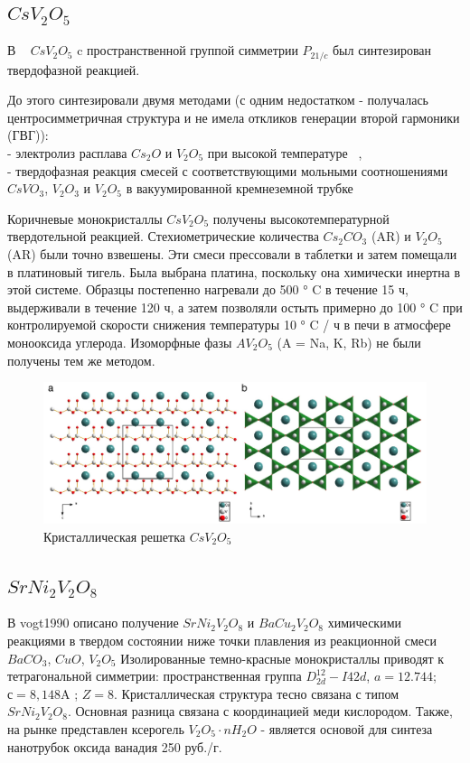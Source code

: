 \documentclass[11pt]{article}
\begin{document}
\subsection{$CsV_2O_5$}
В ~\cite{luo2013} $CsV_2O_5$ c пространственной группой симметрии $P_{21/c}$ был синтезирован твердофазной реакцией.

До этого синтезировали двумя методами (с одним недостатком - получалась центросимметричная структура и не имела откликов генерации второй гармоники (ГВГ)): \\

- электролиз расплава $Cs_2O$ и $V_2O_5$ при высокой температуре ~\cite{mumme_1971}, \\

- твердофазная реакция смесей с соответствующими мольными соотношениями $CsVO_3$, $V_2O_3$ и $V_2O_5$ в вакуумированной кремнеземной трубке ~\cite{Ueda_1998}

Коричневые монокристаллы $CsV_2O_5$ получены высокотемпературной твердотельной реакцией. Стехиометрические количества $Cs_2CO_3$ (AR) и $V_2O_5$ (AR) были точно взвешены. Эти смеси прессовали в таблетки и затем помещали в платиновый тигель. Была выбрана платина, поскольку она химически инертна в этой системе. Образцы постепенно нагревали до 500 ° C в течение 15 ч, выдерживали в течение 120 ч, а затем позволяли остыть примерно до 100 ° C при контролируемой скорости снижения температуры 10 ° C / ч в печи в атмосфере монооксида углерода. Изоморфные фазы $AV_2O_5$ (A = Na, K, Rb) не были получены тем же методом.

\begin{figure}[htp]
\centering
\includegraphics[scale=0.35]{CsV_2O_5}
\caption{Кристаллическая решетка $CsV_2O_5$ ~\cite{luo2013}}
\label{}
\end{figure}


\subsection{$SrNi_2V_2O_8$}
В {vogt1990} описано получение $SrNi_2V_2O_8$ и $BaCu_2V_2O_8$ химическими реакциями в твердом состоянии ниже точки плавления из реакционной смеси $BaCO_3$, $CuO$, $V_2O_5$ Изолированные темно-красные монокристаллы приводят к тетрагональной симметрии: пространственная группа $D_{2d}^{12}-I42d$, $a = 12.744$; $с = 8,148$A ; $Z = 8$. Кристаллическая структура тесно связана с типом $SrNi_2V_2O_8$. Основная разница связана с координацией меди кислородом.
Также, на рынке представлен ксерогель $V_2O_5 \cdot nH_2O$ - является основой для синтеза нанотрубок оксида ванадия 250 руб./г.
\end{document}
